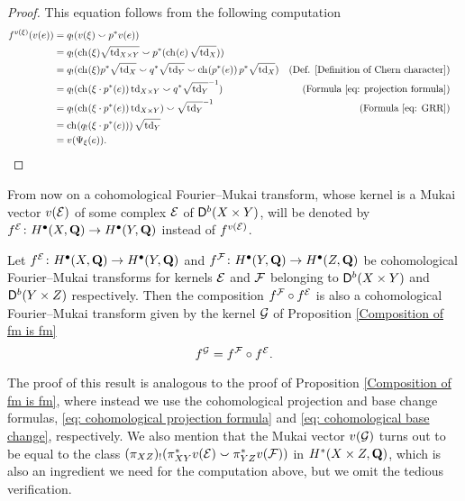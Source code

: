 \begin{proof}
    This equation follows from the following computation
    \begin{align*}
        \fmcoh{v(\xi)}(v(e)) &=
        q_!(v(\xi) \smallsmile p^*v(e)) \\
        &= q_!(\ch[](\xi)\sqrt{\tdclass{X \times Y}} \smallsmile p^*(\ch[]{e}\sqrt{\tdclass{X}})) \\
        &= q_!(\ch[](\xi)p^*\sqrt{\tdclass{X}} \smallsmile q^*\sqrt{\tdclass{Y}} \smallsmile \ch[]{p^*(e)}p^*\sqrt{\tdclass{X}}) & \text{(Def. \ref{Definition of Chern character})} \\
        &= q_!(\ch[](\xi \cdot p^*(e))\tdclass{X \times Y} \smallsmile q^*\sqrt{\tdclass{Y}}\inv) & \text{(Formula \eqref{eq: projection formula})}\\
        &= q_!(\ch[](\xi \cdot p^*(e))\tdclass{X \times Y}) \smallsmile \sqrt{\tdclass{Y}}\inv & \text{(Formula \eqref{eq: GRR})} \\
        &= \ch[]{q_!(\xi \cdot p^*(e))}\sqrt{\tdclass{Y}} \\
        &= v(\fmkt{\xi}(e)). & & \qedhere
    \end{align*}
\end{proof}

From now on a cohomological Fourier--Mukai transform, whose kernel is a Mukai vector $v(\mathcal E)$ of some complex $\mathcal E$ of $\mathsf{D}^b(X \times Y)$, will be denoted by $f^{\mathcal E} \colon H^{\bullet}(X, \mathbf Q) \to H^{\bullet}(Y, \mathbf Q)$ instead of $f^{v(\mathcal E)}$.   

\begin{proposition}
    \emph{\cite[\S 5.2, Lemma 5.32]{huybrechts2006fouriermukai}}
    \label{Composition of cohomological fm is fm}
    Let $f^{\mathcal E} \colon H^\bullet(X, \mathbf Q) \to H^\bullet(Y, \mathbf Q)$ and $f^{\mathcal F} \colon H^\bullet(Y, \mathbf Q) \to H^\bullet(Z, \mathbf Q)$ be cohomological Fourier--Mukai transforms for kernels $\mathcal E$ and $\mathcal F$ belonging to $\mathsf{D}^b(X \times Y)$ and $\mathsf{D}^b(Y \times Z)$ respectively. Then the composition $f^{\mathcal F} \circ f^{\mathcal E}$ is also a cohomological Fourier--Mukai transform given by the kernel $\mathcal G$ of Proposition \ref{Composition of fm is fm}
    \[
        f^{\mathcal G} = f^{\mathcal F} \circ f^{\mathcal E}.
    \]
\end{proposition}

\begin{remark}
    The proof of this result is analogous to the proof of Proposition \ref{Composition of fm is fm}, where instead we use the cohomological projection and base change formulas, \eqref{eq: cohomological projection formula} and \eqref{eq: cohomological base change}, respectively. We also mention that the Mukai vector $v(\mathcal G)$ turns out to be equal to the class $(\pi_{XZ})_!(\pi_{XY}^*v(\mathcal E) \smallsmile \pi_{YZ}^*v(\mathcal F))$ in $H^{*}(X \times Z, \mathbf Q)$, which is also an ingredient we need for the computation above, but we omit the tedious verification.
\end{remark}


